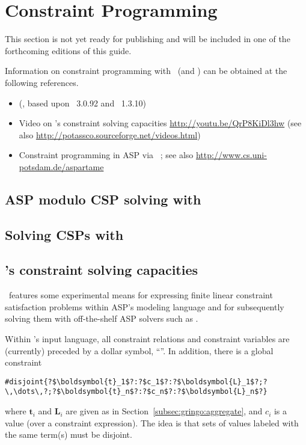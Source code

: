 \section{Constraint Programming}\label{sec:constraint}

This section is not yet ready for publishing
and will be included in one of the forthcoming editions of this guide.

Information on constraint programming with \gringo\ (and \clingcon) can be obtained at the following references.

\begin{itemize}
\item \cite{geossc09a,ostsch12a} (\clingcon, based upon \gringo~3.0.92 and \clasp~1.3.10)
\item Video on \gringo's constraint solving capacities \url{http://youtu.be/QrP8KiDl3hw} (see also \url{http://potassco.sourceforge.net/videos.html})
\item Constraint programming in ASP via \aspartame\ \cite{bageinscsotawe13a}; see also \url{http://www.cs.uni-potsdam.de/aspartame}
\end{itemize}

\subsection{ASP modulo CSP solving with \clingcon}
\label{sec:clingcon}

\subsection{Solving CSPs with \aspartame}
\label{sec:aspartame}

\subsection{\gringo's constraint solving capacities}

\gringo\ features some experimental means for expressing finite linear constraint satisfaction problems within ASP's modeling language and
for subsequently solving them with off-the-shelf ASP solvers such as \clasp.

Within \gringo's input language,
all constraint relations and constraint variables are (currently) preceded by a dollar symbol, ``\var{\$}''.
In addition, there is a global constraint
\begin{lstlisting}[numbers=none,escapechar=?]
#disjoint{?$\boldsymbol{t}_1$?:?$c_1$?:?$\boldsymbol{L}_1$?;?\,\dots\,?;?$\boldsymbol{t}_n$?:?$c_n$?:?$\boldsymbol{L}_n$?}
\end{lstlisting}
where $\boldsymbol{t}_i$ and $\boldsymbol{L}_i$ are given as in Section~\ref{subsec:gringo:aggregate},
and $c_i$ is a value (over a constraint expression).
%
The idea is that sets of values labeled with the same term(s) must be disjoint.

